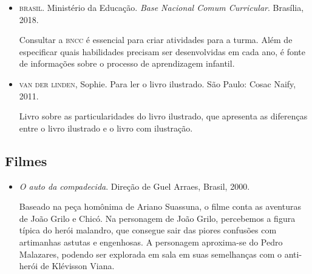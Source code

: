 \documentclass[11pt]{extarticle}
\begin{document}
\begin{itemize}
\item \textsc{brasil}. Ministério da Educação. \textit{Base Nacional Comum Curricular}. Brasília, 2018.

Consultar a \textsc{bncc} é essencial para criar atividades para a turma. Além de especificar 
quais habilidades precisam ser desenvolvidas em cada ano, é fonte de informações sobre 
o processo de aprendizagem infantil. 


\item \textsc{van der linden}, Sophie. Para ler o livro ilustrado. São Paulo: Cosac Naify, 2011.

Livro sobre as particularidades do livro ilustrado, que apresenta as diferenças entre o livro ilustrado e o livro com ilustração. 
\end{itemize}

\subsection{Filmes}

\begin{itemize}
\item \textit{O auto da compadecida}. Direção de Guel Arraes, Brasil, 2000.

Baseado na peça homônima de Ariano Suassuna, o filme conta as aventuras de João Grilo e Chicó. Na personagem de João Grilo, percebemos a figura típica do herói malandro, que consegue sair das piores confusões com artimanhas astutas e engenhosas. A personagem aproxima-se do Pedro Malazares, podendo ser explorada em sala em suas semelhanças com o anti-herói de Klévisson Viana.
\end{itemize}
\end{document}
